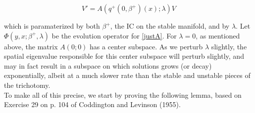 \documentclass[12pt]{article}
\begin{document}
\begin{equation}\label{justA}
V' = A(q^+(0, \beta^+)(x); \lambda) V
\end{equation}

which is paramaterized by both $\beta^+$, the IC on the stable manifold, and by $\lambda$. Let $\Phi(y, x; \beta^+, \lambda)$ be the evolution operator for \eqref{justA}. For $\lambda = 0$, as mentioned above, the matrix $A(0; 0)$ has a center subspace. As we perturb $\lambda$ slightly, the spatial eigenvalue responsible for this center subspace will perturb slightly, and may in fact result in a subspace on which solutions grows (or decay) exponentially, albeit at a much slower rate than the stable and unstable pieces of the trichotomy.\\

To make all of this precise, we start by proving the following lemma, based on Exercise 29 on p. 104 of Coddington and Levinson (1955).

\end{document}
